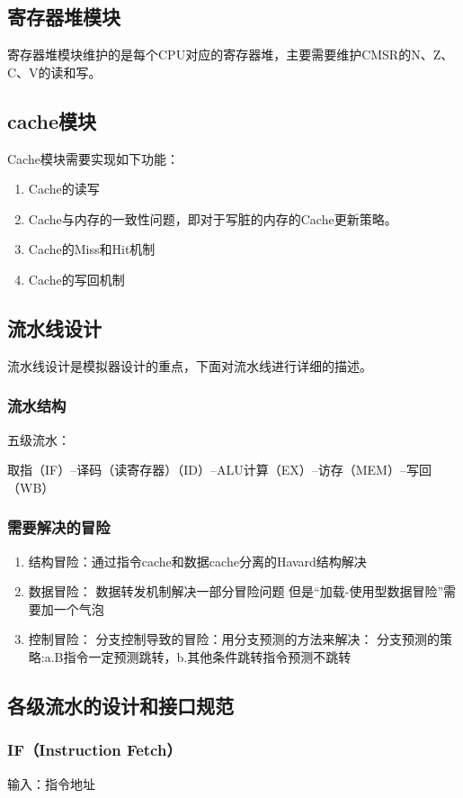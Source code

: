 \documentclass[12pt,a4paper]{article}
\begin{document}
\subsection{寄存器堆模块}
	寄存器堆模块维护的是每个CPU对应的寄存器堆，主要需要维护CMSR的N、Z、C、V的读和写。
	
\subsection{cache模块}
	Cache模块需要实现如下功能：
	\begin{enumerate}
		\item Cache的读写
		\item Cache与内存的一致性问题，即对于写脏的内存的Cache更新策略。
		\item Cache的Miss和Hit机制
		\item Cache的写回机制
	\end{enumerate}
	
\subsection{流水线设计}	
流水线设计是模拟器设计的重点，下面对流水线进行详细的描述。

\subsubsection{流水结构}
五级流水：

取指（IF）--译码（读寄存器）（ID）--ALU计算（EX）--访存（MEM）--写回（WB）

\subsubsection{需要解决的冒险}
\begin{enumerate}
\item 结构冒险：通过指令cache和数据cache分离的Havard结构解决
\item 数据冒险：
	\subitem 数据转发机制解决一部分冒险问题
	\subitem 但是“加载-使用型数据冒险”需要加一个气泡
\item 控制冒险：
	\subitem 分支控制导致的冒险：用分支预测的方法来解决：
	\subitem 分支预测的策略:a.B指令一定预测跳转，b.其他条件跳转指令预测不跳转
\end{enumerate}

\subsection{各级流水的设计和接口规范}
\subsubsection{IF（Instruction Fetch）}
输入：指令地址
\end{document}
